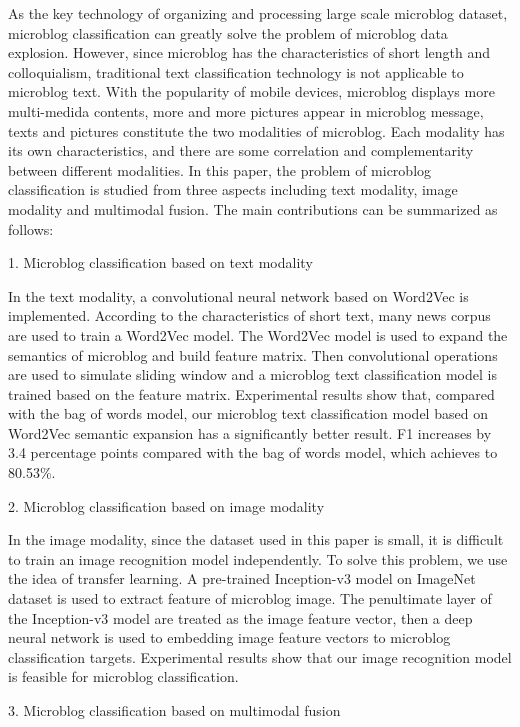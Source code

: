 \begin{eabstract}

As the key technology of organizing and processing large scale microblog dataset, microblog classification can greatly solve the problem of microblog data explosion. However, since microblog has the characteristics of short length and colloquialism, traditional text classification technology is not applicable to microblog text.
With the popularity of mobile devices, microblog displays more multi-medida contents,
more and more pictures appear in microblog message, texts and pictures constitute the two modalities of microblog.
Each modality has its own characteristics,
and there are some correlation and complementarity between different modalities.
In this paper,
the problem of microblog classification is studied from three aspects including text modality, image modality and multimodal fusion.
The main contributions can be summarized as follows:

1. Microblog classification based on text modality

In the text modality, a convolutional neural network based on Word2Vec is implemented.
According to the characteristics of short text, many news corpus are used to train a Word2Vec model.
The Word2Vec model is used to expand the semantics of microblog and build feature matrix.
Then convolutional operations are used to simulate sliding window and
a microblog text classification model is trained based on the feature matrix.
Experimental results show that, compared with the bag of words model, our microblog text classification model based on Word2Vec semantic expansion has a significantly better result.
F1 increases by 3.4 percentage points compared with the bag of words model, which achieves to 80.53\%.

2. Microblog classification based on image modality

In the image modality, since the dataset used in this paper is small, it is difficult to train an image recognition model independently.
To solve this problem, we use the idea of transfer learning.
A pre-trained Inception-v3 model on ImageNet dataset is used to extract feature of microblog image.
The penultimate layer of the Inception-v3 model are treated as the image feature vector,
then a deep neural network is used to embedding image feature vectors to microblog classification targets.
Experimental results show that our image recognition model is feasible for microblog classification.


3. Microblog classification based on multimodal fusion


\end{eabstract}

